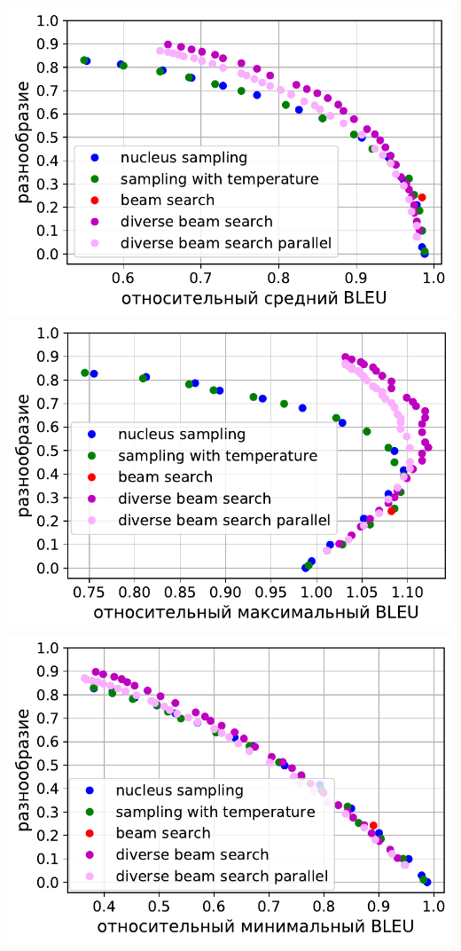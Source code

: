 \documentclass[a4paper, 12pt]{extarticle}
\begin{document}
\begin{center}
\includegraphics[scale=0.5]{avg-bleu-diverse-beam-search.pdf}
\includegraphics[scale=0.5]{max-bleu-diverse-beam-search.pdf}
\includegraphics[scale=0.5]{min-bleu-diverse-beam-search.pdf}
\end{center}
\end{document}

